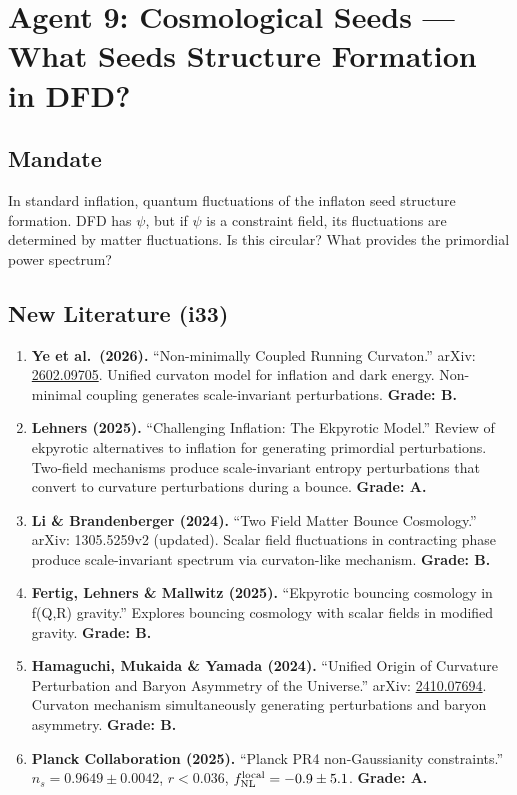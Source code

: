 \documentclass[11pt,a4paper]{article}
\begin{document}
\section{Agent 9: Cosmological Seeds --- What Seeds Structure Formation in DFD?}
\label{sec:agent9}

\subsection{Mandate}

In standard inflation, quantum fluctuations of the inflaton seed structure formation. DFD has $\psi$, but if $\psi$ is a constraint field, its fluctuations are determined by matter fluctuations. Is this circular? What provides the primordial power spectrum?

\subsection{New Literature (i33)}

\begin{enumerate}
\item \textbf{Ye et al.\ (2026).} ``Non-minimally Coupled Running Curvaton.'' arXiv: \href{https://arxiv.org/abs/2602.09705}{2602.09705}. Unified curvaton model for inflation and dark energy. Non-minimal coupling generates scale-invariant perturbations. \textbf{Grade: B.}

\item \textbf{Lehners (2025).} ``Challenging Inflation: The Ekpyrotic Model.'' Review of ekpyrotic alternatives to inflation for generating primordial perturbations. Two-field mechanisms produce scale-invariant entropy perturbations that convert to curvature perturbations during a bounce. \textbf{Grade: A.}

\item \textbf{Li \& Brandenberger (2024).} ``Two Field Matter Bounce Cosmology.'' arXiv: 1305.5259v2 (updated). Scalar field fluctuations in contracting phase produce scale-invariant spectrum via curvaton-like mechanism. \textbf{Grade: B.}

\item \textbf{Fertig, Lehners \& Mallwitz (2025).} ``Ekpyrotic bouncing cosmology in f(Q,R) gravity.'' Explores bouncing cosmology with scalar fields in modified gravity. \textbf{Grade: B.}

\item \textbf{Hamaguchi, Mukaida \& Yamada (2024).} ``Unified Origin of Curvature Perturbation and Baryon Asymmetry of the Universe.'' arXiv: \href{https://arxiv.org/abs/2410.07694}{2410.07694}. Curvaton mechanism simultaneously generating perturbations and baryon asymmetry. \textbf{Grade: B.}

\item \textbf{Planck Collaboration (2025).} ``Planck PR4 non-Gaussianity constraints.'' $n_s = 0.9649 \pm 0.0042$, $r < 0.036$, $f_{\rm NL}^{\rm local} = -0.9 \pm 5.1$. \textbf{Grade: A.}
\end{enumerate}
\end{document}
